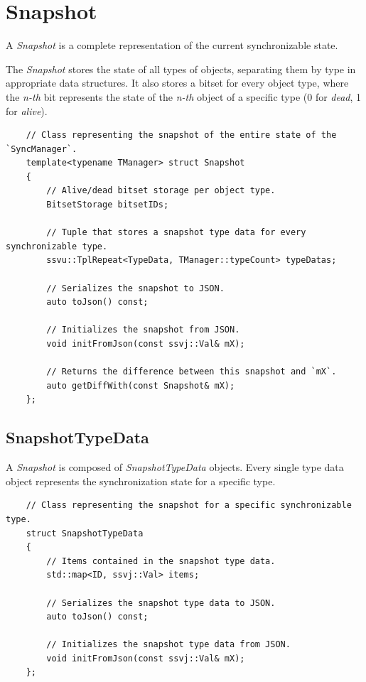 \documentclass{report}
\begin{document}
        \section{Snapshot}

            A \emph{Snapshot} is a complete representation of the current synchronizable state.

            The \emph{Snapshot} stores the state of all types of objects, separating them by type in appropriate data structures.
            It also stores a bitset for every object type, where the \emph{n-th} bit represents the state of the \emph{n-th} object of a specific type (0 for \emph{dead}, 1 for \emph{alive}).

\begin{verbatim}
    // Class representing the snapshot of the entire state of the `SyncManager`.
    template<typename TManager> struct Snapshot
    {
        // Alive/dead bitset storage per object type.
        BitsetStorage bitsetIDs;

        // Tuple that stores a snapshot type data for every synchronizable type.
        ssvu::TplRepeat<TypeData, TManager::typeCount> typeDatas;

        // Serializes the snapshot to JSON.
        auto toJson() const;

        // Initializes the snapshot from JSON.
        void initFromJson(const ssvj::Val& mX);

        // Returns the difference between this snapshot and `mX`.
        auto getDiffWith(const Snapshot& mX);
    };
\end{verbatim}

            \subsection{SnapshotTypeData}

                A \emph{Snapshot} is composed of \emph{SnapshotTypeData} objects. 
                Every single type data object represents the synchronization state for a specific type.

\begin{verbatim}
    // Class representing the snapshot for a specific synchronizable type.
    struct SnapshotTypeData
    {
        // Items contained in the snapshot type data.
        std::map<ID, ssvj::Val> items;

        // Serializes the snapshot type data to JSON.
        auto toJson() const;

        // Initializes the snapshot type data from JSON.
        void initFromJson(const ssvj::Val& mX);
    };
\end{verbatim}
    
\end{document}
